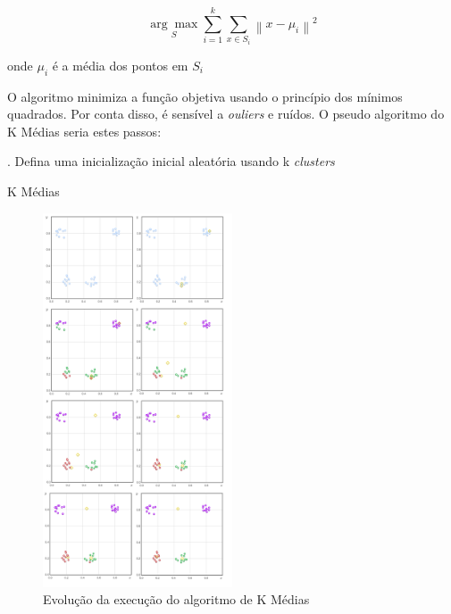 \begin{equation}
\label{eq:media}
\underset{S}{\arg\max} \sum_{i=1}^{k} \sum_{x \in S_{i}}\left \| x - \mu_{i} \right \|^{2}
\end{equation}

onde \begin{math}\mu_{i}\end{math} é a média dos pontos em \begin{math}S_{i}\end{math}

O algoritmo minimiza a função objetiva usando o princípio dos mínimos quadrados. Por conta disso, é sensível a \emph{ouliers} e ruídos. O pseudo algoritmo do K Médias seria estes passos:\\

\begin{algorithm}[H]
. Defina uma inicialização inicial aleatória usando k \emph{clusters}\;
 \caption{K Médias}
\end{algorithm}

\vspace{5mm}


\begin{figure}[!ht]
\caption{Evolução da execução do algoritmo de K Médias }
\centerline{\includegraphics[width=0.5\textwidth]{img/k-means}}
\end{figure}



